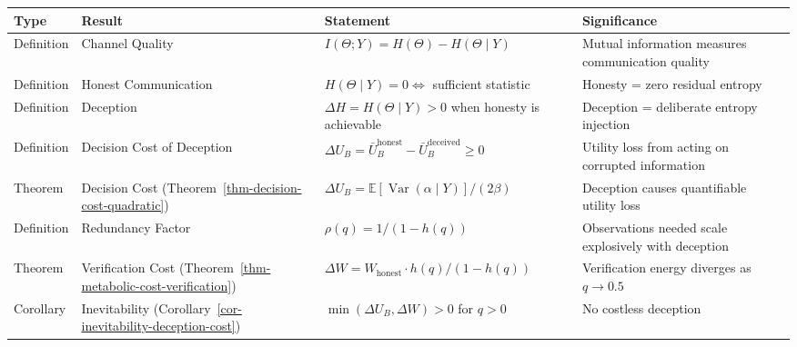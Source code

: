 \documentclass[11pt]{article}
\theoremstyle{plain}
\theoremstyle{definition}
\theoremstyle{remark}
\newcounter{none}
\begin{document}
{\def\LTcaptype{none} %
\begin{longtable}[]{@{}
  >{\raggedright\arraybackslash}p{}
  >{\raggedright\arraybackslash}p{}
  >{\raggedright\arraybackslash}p{}
  >{\raggedright\arraybackslash}p{}@{}}
\toprule\noalign{}
\begin{minipage}[b]{\linewidth}\raggedright
Type
\end{minipage} & \begin{minipage}[b]{\linewidth}\raggedright
Result
\end{minipage} & \begin{minipage}[b]{\linewidth}\raggedright
Statement
\end{minipage} & \begin{minipage}[b]{\linewidth}\raggedright
Significance
\end{minipage} \\
\midrule\noalign{}
\endhead
\bottomrule\noalign{}
\endlastfoot
Definition & Channel Quality &
\(I(\Theta; Y) = H(\Theta) - H(\Theta\mid Y)\) & Mutual information
measures communication quality \\
Definition & Honest Communication & \(H(\Theta\mid Y) = 0 \iff\)
sufficient statistic & Honesty = zero residual entropy \\
Definition & Deception & \(\Delta H = H(\Theta\mid Y) > 0\) when honesty
is achievable & Deception = deliberate entropy injection \\
Definition & Decision Cost of Deception &
\(\Delta U_B = \bar{U}_B^{\text{honest}} - \bar{U}_B^{\text{deceived}} \geq 0\)
& Utility loss from acting on corrupted information \\
Theorem & Decision Cost (Theorem~\ref{thm-decision-cost-quadratic}) &
\(\Delta U_B = \mathbb{E}[\operatorname{Var}(\alpha \mid Y)] / (2\beta)\)
& Deception causes quantifiable utility loss \\
Definition & Redundancy Factor & \(\rho(q) = 1/(1-h(q))\) & Observations
needed scale explosively with deception \\
Theorem & Verification Cost
(Theorem~\ref{thm-metabolic-cost-verification}) &
\(\Delta W = W_{\text{honest}} \cdot h(q)/(1-h(q))\) & Verification
energy diverges as \(q \to 0.5\) \\
Corollary & Inevitability
(Corollary~\ref{cor-inevitability-deception-cost}) &
\(\min(\Delta U_B, \Delta W) > 0\) for \(q > 0\) & No costless deception

\end{longtable}}
\end{document}
